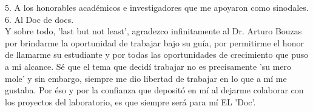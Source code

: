 \documentclass[
11pt, %
spanish, %
singlespacing, %
headsepline, %
]{MastersDoctoralThesis} %
\begin{document}
\begin{acknowledgements}

5. A los honorables académicos e investigadores que me apoyaron como sinodales.\\




6. Al Doc de docs.\\

Y sobre todo, 'last but not least', agradezco infinitamente al Dr. Arturo Bouzas por brindarme la oportunidad de trabajar bajo su guía, por permitirme el honor de llamarme su estudiante y por todas las oportunidades de crecimiento que puso a mi alcance. Sé que el tema que decidí trabajar no es precisamente 'su mero mole' y sin embargo, siempre me dio libertad de trabajar en lo que a mí me gustaba. Por éso y por la confianza que depositó en mí al dejarme colaborar con los proyectos del laboratorio, es que siempre será para mí EL 'Doc'.\\

\end{acknowledgements}


\tableofcontents %
\end{document}
